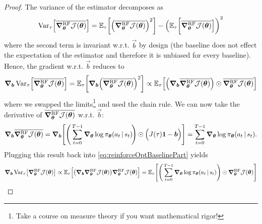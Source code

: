 			\begin{proof}
				The variance of the estimator decomposes as
				\begin{equation}
					\operatorname{Var}_\tau\Bigl[  \overline{\grad_{\bm{\theta}}^\mathrm{RF} \mathcal{J}(\bm{\theta})} \Bigr]
						= \mathbb{E}_\tau\biggl[ \Bigl( \overline{\grad_{\bm{\theta}}^\mathrm{RF} \mathcal{J}(\bm{\theta})} \Bigr)^2 \biggr] - \Bigl( \mathbb{E}_\tau\biggl[ \overline{\grad_{\bm{\theta}}^\mathrm{RF} \mathcal{J}(\bm{\theta})} \Bigr] \biggr)^2
				\end{equation}
				where the second term is invariant w.r.t. \(\vec{b}\) by design (the baseline does not effect the expectation of the estimator and therefore it is unbiased for every baseline). Hence, the gradient w.r.t. \(\vec{b}\) reduces to
				\begin{equation}
					\grad_{\bm{b}} \operatorname{Var}_\tau\Bigl[ \overline{\grad_{\bm{\theta}}^\mathrm{RF} \mathcal{J}(\bm{\theta})} \Bigr]
						= \mathbb{E}_\tau\biggl[ \grad_{\bm{b}} \Bigl( \overline{\grad_{\bm{\theta}}^\mathrm{RF} \mathcal{J}(\bm{\theta})} \Bigr)^2 \biggr]
						\propto \mathbb{E}_\tau\Bigl[ \Bigl( \grad_{\bm{b}} \overline{\grad_{\bm{\theta}}^\mathrm{RF} \mathcal{J}(\bm{\theta})} \Bigr) \odot \overline{\grad_{\bm{\theta}}^\mathrm{RF} \mathcal{J}(\bm{\theta})} \Bigr]
					\label{eq:reinforceOptBaselinePart}
				\end{equation}
				where we swapped the limits\footnote{Take a course on measure theory if you want mathematical rigor!} and used the chain rule. We can now take the derivative of \( \overline{\grad_{\bm{\theta}}^\mathrm{RF} \mathcal{J}(\bm{\theta})} \) w.r.t. \(\vec{b}\):
				\begin{equation}
					\grad_{\bm{b}} \overline{\grad_{\bm{\theta}}^\mathrm{RF} \mathcal{J}(\bm{\theta})}
						= \grad_{\bm{b}} \Biggl[ \Biggl(\, \sum_{t = 0}^{T - 1} \grad_{\bm{\theta}} \log \pi_{\bm{\theta}}(a_t \,\vert\, s_t) \!\Biggr) \odot \Bigl( J(\tau) \bm{1} - \bm{b} \Bigr) \Biggr]
						= \sum_{t = 0}^{T - 1} \grad_{\bm{\theta}} \log \pi_{\bm{\theta}}(a_t \,\vert\, s_t).
				\end{equation}
				Plugging this result back into \eqref{eq:reinforceOptBaselinePart} yields
				\begin{align}
					\grad_{\vec{b}} \Var_\tau\bigl[ \grad_{\vec{\theta}}^\mathrm{RF} \mathcal{J}(\vec{\theta}) \bigr]
						&\propto \E_\tau\Bigl[ \bigl( \grad_{\vec{b}} \grad_{\vec{\theta}}^\mathrm{RF} \mathcal{J}(\vec{\theta}) \bigr) \grad_{\vec{\theta}}^\mathrm{RF} \mathcal{J}(\vec{\theta}) \Bigr]
						 = \E_\tau\Biggl[ \Biggl(\, \sum_{t = 0}^{T - 1} \grad_{\vec{\theta}} \log \pi_{\vec{\theta}}(a_t \given s_t) \Biggr) \odot \grad_{\vec{\theta}}^\mathrm{RF} \mathcal{J}(\vec{\theta}) \Biggr] \\

\end{align}
\end{proof}
